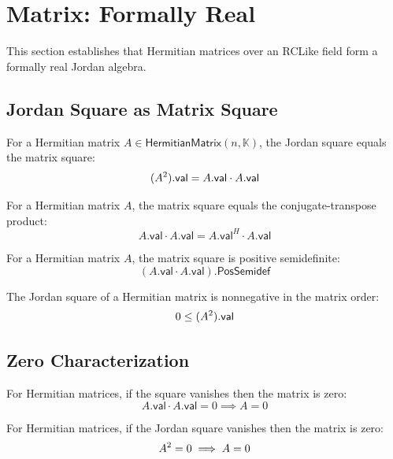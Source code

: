 \section{Matrix: Formally Real}

This section establishes that Hermitian matrices over an RCLike field form a formally real Jordan algebra.

\subsection{Jordan Square as Matrix Square}

\begin{theorem}
For a Hermitian matrix $A \in \mathsf{HermitianMatrix}(n, \mathbb{K})$, the Jordan square equals the matrix square:
\[ (A^{2}).\mathsf{val} = A.\mathsf{val} \cdot A.\mathsf{val} \]
\end{theorem}

\begin{theorem}
For a Hermitian matrix $A$, the matrix square equals the conjugate-transpose product:
\[ A.\mathsf{val} \cdot A.\mathsf{val} = A.\mathsf{val}^H \cdot A.\mathsf{val} \]
\end{theorem}

\begin{theorem}[sq\_posSemidef]
For a Hermitian matrix $A$, the matrix square is positive semidefinite:
\[ (A.\mathsf{val} \cdot A.\mathsf{val}).\mathsf{PosSemidef} \]
\end{theorem}

\begin{theorem}
The Jordan square of a Hermitian matrix is nonnegative in the matrix order:
\[ 0 \le (A^{2}).\mathsf{val} \]
\end{theorem}

\subsection{Zero Characterization}

\begin{theorem}
For Hermitian matrices, if the square vanishes then the matrix is zero:
\[ A.\mathsf{val} \cdot A.\mathsf{val} = 0 \implies A = 0 \]
\end{theorem}

\begin{theorem}
For Hermitian matrices, if the Jordan square vanishes then the matrix is zero:
\[ A^{2} = 0 \implies A = 0 \]
\end{theorem}

